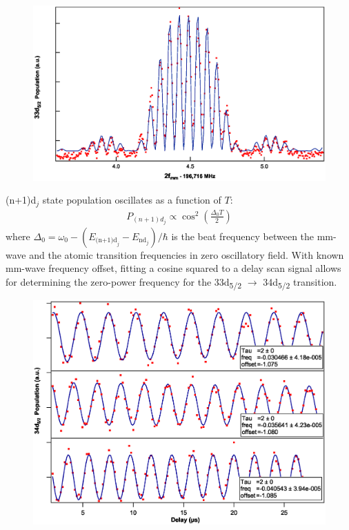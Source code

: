 \documentclass[landscape]{sciposter}
\begin{document}
\begin{multicols}{4}
\begin{figure}
	\begin{center}
		\includegraphics[scale = 1]{fringes.eps}
		\caption{}
		\label{Ramsey fringes}
	\end{center}
\end{figure}
(n+1)d$_j$ state population oscillates as a function of $T$: 
\begin{align*}
\boxed{P_{(n+1)d_j} \propto {\cos}^{2}\left(\frac{\Delta_{0} T}{2}\right)}
\end{align*}
where $\Delta_0=\omega_0-(E_{\text{(n+1)d}_j}-E_{\text{nd}_j})/\hbar$ is the beat frequency between the mm-wave and the atomic transition frequencies in zero oscillatory field. With known mm-wave frequency offset, fitting a cosine squared to a delay scan signal allows for determining the zero-power frequency for the 33d\textsubscript{5/2} $\rightarrow$ 34d\textsubscript{5/2} transition.

\begin{figure}
\includegraphics[scale = 1]{data68-67-69.eps}
\caption{}
\label{Ramsey}
\end{figure}


\end{multicols}
\end{document}
